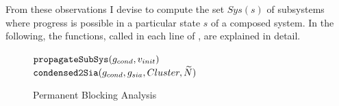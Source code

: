 From these observations I devise \Alg{\ref{alg_blocking}} to compute the set $Sys(s)$ of subsystems where progress is possible in a particular state $s$ of a composed system.
In the following, the functions, called in each line of \Alg{\ref{alg_blocking}}, are explained in detail.
\begin{figure}[!t]
    \TopAlgSpace
    \removelatexerror
    \begin{algorithm}[H]
        \caption{Permanent Blocking Analysis}
        \label{alg_blocking}
        \begin{algorithmic}[1]
            \Statex
            \State $\textnormal{\tt propagateSubSys}( g_{cond}, v_{init} )$
            \State $\textnormal{\tt condensed2Sia}( g_{cond}, g_{sia}, Cluster, \widetilde{N} )$
        \end{algorithmic}
    \end{algorithm}
    \BotAlgSpace
\end{figure}
